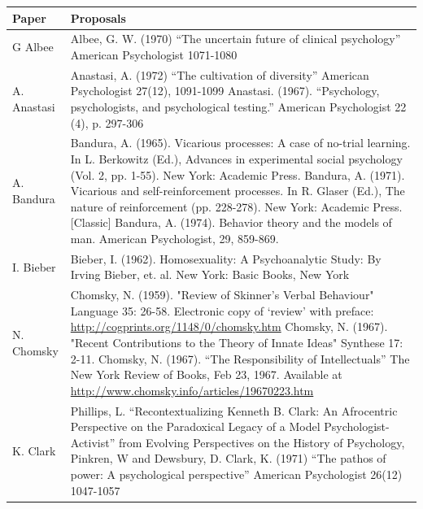 \begin{refsection}
 \begin{longtable}[!t]{ | p{3cm} |  p{12cm} |  }
\hline

Paper&
Proposals \\ \hline

G Albee & Albee, G. W. (1970) “The uncertain future of clinical psychology” American Psychologist 1071-1080\\ \hline
A. Anastasi&Anastasi, A. (1972) “The cultivation of diversity” American Psychologist 27(12), 1091-1099 \newline
Anastasi. (1967). “Psychology, psychologists, and psychological testing.” American Psychologist 22 (4), p. 297-306 \\ \hline

A. Bandura&
Bandura, A. (1965). Vicarious processes: A case of no-trial learning. In L. Berkowitz (Ed.), Advances in experimental social psychology (Vol. 2, pp. 1-55). New York: Academic Press.\newline
Bandura, A. (1971). Vicarious and self-reinforcement processes. In R. Glaser (Ed.), The nature of reinforcement (pp. 228-278). New York: Academic Press. [Classic]\newline
Bandura, A. (1974). Behavior theory and the models of man. American Psychologist, 29, 859-869. \\ \hline

I. Bieber&Bieber, I. (1962). Homosexuality: A Psychoanalytic Study: By Irving Bieber, et. al. New York: Basic Books, New York \\ \hline


N. Chomsky& Chomsky, N. (1959). "Review of Skinner's Verbal Behaviour" Language 35: 26-58. Electronic copy of ‘review’ with preface: \url{http://cogprints.org/1148/0/chomsky.htm}
\newline
Chomsky, N. (1967). "Recent Contributions to the Theory of Innate Ideas" Synthese 17: 2-11.
\newline
Chomsky, N. (1967). “The Responsibility of Intellectuals” The New York Review of Books, Feb 23, 1967. Available at \url{http://www.chomsky.info/articles/19670223.htm}
\\ \hline

K. Clark&
Phillips, L. “Recontextualizing Kenneth B. Clark: An Afrocentric Perspective on the Paradoxical Legacy of a Model Psychologist-Activist” from Evolving Perspectives on the History of Psychology, Pinkren, W and Dewsbury, D.
\newline
Clark, K. (1971) “The pathos of power: A psychological perspective” American Psychologist 26(12) 1047-1057 \\ \hline


\end{longtable}
\end{refsection}
